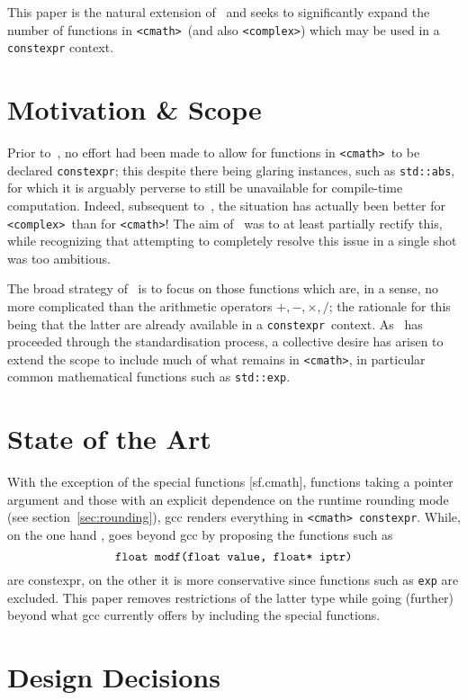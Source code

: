 \documentclass[prd,twocolumn,amsmath,amssymb,nofootinbib,eqsecnum]{revtex4-1}
\newcommand{\constexpr}{\code{constexpr}\xspace}
\newcommand{\code}[1]{{\tt #1}}
\newcommand{\header}[1]{{\tt <#1>}}
\newcommand{\cmath}{\header{cmath}}
\newcommand{\complex}{\header{complex}}
\newcommand{\Operators}{\ensuremath{+,-,\times,/}}
\begin{document}
This paper is the natural extension of~\cite{Rosten-constexpr} and seeks to significantly expand the number of functions in \cmath\ (and also \complex) which may be used in a \constexpr context. 


\section{Motivation \& Scope}

Prior to~\cite{Rosten-constexpr}, no effort had been made to allow for functions in \cmath\ to be declared \constexpr; this despite there being glaring instances, such as \code{std::abs}, for which it is arguably perverse to still be unavailable for compile-time computation. Indeed, subsequent to~\cite{AP-complex}, the situation has actually been better for \complex\ than for \cmath! The aim of~\cite{Rosten-constexpr} was to at least partially rectify this, while recognizing that attempting to completely resolve this issue in a single shot was too ambitious.

The broad strategy of~\cite{Rosten-constexpr} is to focus on those functions which are, in a sense, no more complicated than the arithmetic operators \Operators; the rationale for this being that the latter are already available in a \constexpr\ context.
As~\cite{Rosten-constexpr} has proceeded through the standardisation process, a collective desire has arisen to extend the scope to include much of what remains in \cmath, in particular common mathematical functions such as \code{std::exp}.


\section{State of the Art}

With the exception of the special functions [sf.cmath], functions taking a pointer argument and those with an explicit dependence on the runtime rounding mode (see section~\ref{sec:rounding}), gcc renders everything in \cmath\ \constexpr. While, on the one hand \cite{Rosten-constexpr}, goes beyond gcc by proposing the functions such as
\[
	\mbox{\code{float modf(float value, float* iptr)}}
\]
are constexpr, on the other it is more conservative since functions such as \code{exp} are excluded. This paper removes restrictions of the latter type while going (further) beyond what gcc currently offers by including the special functions.

\section{Design Decisions}
\end{document}
